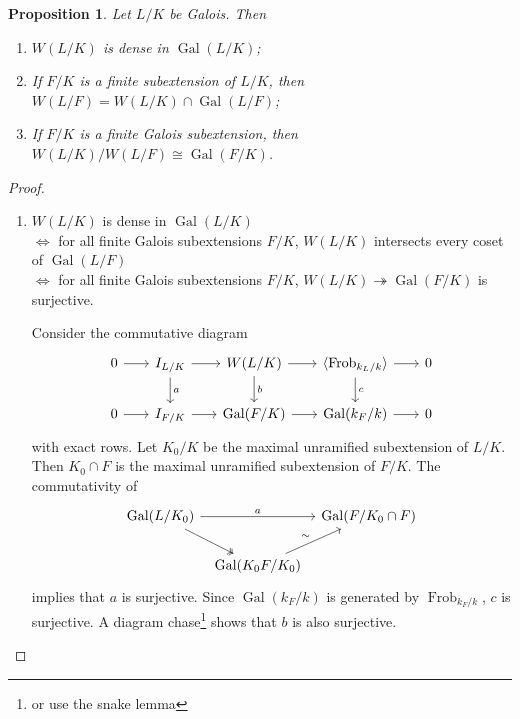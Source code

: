 \documentclass[11pt]{article}
\theoremstyle{definition}
\theoremstyle{plain}
\newtheorem{proposition}[definition]{Proposition}
\theoremstyle{remark}
\DeclareMathOperator{\Gal}{Gal}
\DeclareMathOperator{\Frob}{Frob}
\begin{document}
\begin{proposition}\label{prop:16_8}
    Let $L/K$ be Galois. Then
    \begin{enumerate}
        \item $W(L/K)$ is dense in $\Gal(L/K)$;
        \item If $F/K$ is a finite subextension of $L/K$, then $W(L/F) = W(L/K) \cap \Gal(L/F)$;
        \item If $F/K$ is a finite Galois subextension, then $W(L/K)/W(L/F) \cong \Gal(F/K)$.
    \end{enumerate}
\end{proposition}
\begin{proof}\phantom{}
    \begin{enumerate}
        \item $W(L/K)$ is dense in $\Gal(L/K)$\\
            $\iff$ for all finite Galois subextensions $F/K$, $W(L/K)$ intersects every coset of $\Gal(L/F)$\\
            $\iff$ for all finite Galois subextensions $F/K$, $W(L/K) \twoheadrightarrow \Gal(F/K)$ is surjective.

            Consider the commutative diagram
            \begin{equation*}
            \begin{tikzcd}[column sep=scriptsize]
                0 \arrow[r] & I_{L/K} \arrow[r] \arrow[d, "a"] & W(L/K) \arrow[r] \arrow[d, "b"] & \langle \Frob_{k_L/k} \rangle \arrow[r] \arrow[d, "c"] & 0\\
                0 \arrow[r] & I_{F/K} \arrow[r] & \Gal(F/K) \arrow[r] & \Gal(k_F/k) \arrow[r] & 0
            \end{tikzcd}
            \end{equation*}
            with exact rows. Let $K_0/K$ be the maximal unramified subextension of $L/K$. Then $K_0 \cap F$ is the maximal unramified subextension of $F/K$. The commutativity of
            \begin{equation*}
            \begin{tikzcd}[column sep=tiny]
                \Gal(L/K_0) \arrow[rr, "a"] \arrow[rd, twoheadrightarrow] & & \Gal(F/K_0 \cap F) \\
                & \Gal(K_0 F / K_0) \arrow[ur, "\sim"]&
            \end{tikzcd}
            \end{equation*}
            implies that $a$ is surjective. Since $\Gal(k_F/k)$ is generated by $\Frob_{k_F/k}$, $c$ is surjective. A diagram chase\footnote{or use the snake lemma} shows that $b$ is also surjective.


\end{enumerate}
\end{proof}
\end{document}
